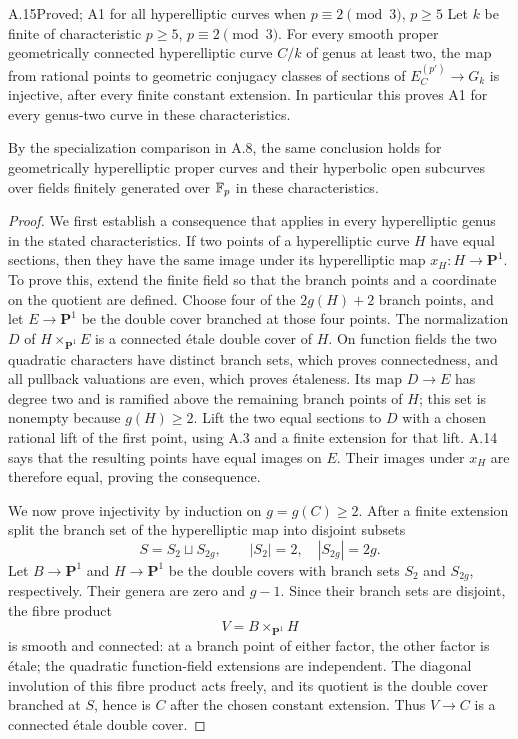 \begin{claim}{A.15}{Proved; A1 for all hyperelliptic curves when $p\equiv2\pmod3$, $p\ge5$}
Let $k$ be finite of characteristic $p\ge5$,
$p\equiv2\pmod3$. For every smooth proper geometrically
connected hyperelliptic curve $C/k$ of genus at least two,
the map from rational points to geometric conjugacy classes
of sections of $E_C^{(p')}\to G_k$ is injective, after every
finite constant extension. In particular this proves A1
for every genus-two curve in these characteristics.

By the specialization comparison in A.8, the same conclusion
holds for geometrically hyperelliptic proper curves and their
hyperbolic open subcurves over fields finitely generated over
$\mathbb F_p$ in these characteristics.
\end{claim}
\begin{proof}
We first establish a consequence that applies in every
hyperelliptic genus in the stated characteristics. If two
points of a hyperelliptic curve $H$ have equal sections, then
they have the same image under its hyperelliptic map
$x_H:H\to\mathbf P^1$.
To prove this, extend the finite field so that the branch
points and a coordinate on the quotient are defined. Choose
four of the $2g(H)+2$ branch points, and let $E\to\mathbf
P^1$ be the double cover branched at those four points.
The normalization $D$ of $H\times_{\mathbf P^1}E$ is a
connected \'etale double cover of $H$. On function fields
the two quadratic characters have distinct branch sets,
which proves connectedness, and all pullback valuations
are even, which proves \'etaleness. Its map $D\to E$ has
degree two and is ramified above the remaining branch
points of $H$; this set is nonempty because $g(H)\ge2$.
Lift the two equal sections to $D$ with a chosen rational
lift of the first point, using A.3 and a finite extension
for that lift. A.14 says that the resulting points have
equal images on $E$. Their images under $x_H$ are therefore
equal, proving the consequence.

We now prove injectivity by induction on $g=g(C)\ge2$.
After a finite extension split the branch set of the
hyperelliptic map into disjoint subsets
\[
 S=S_2\sqcup S_{2g},\qquad |S_2|=2,
 \quad |S_{2g}|=2g.
\]
Let $B\to\mathbf P^1$ and $H\to\mathbf P^1$ be the double
covers with branch sets $S_2$ and $S_{2g}$, respectively.
Their genera are zero and $g-1$. Since their branch sets
are disjoint, the fibre product
\[
 V=B\times_{\mathbf P^1}H
\]
is smooth and connected: at a branch point of either
factor, the other factor is \'etale; the quadratic
function-field extensions are independent. The diagonal
involution of this fibre product acts freely, and its
quotient is the double cover branched at $S$, hence is
$C$ after the chosen constant extension. Thus $V\to C$
is a connected \'etale double cover.


\end{proof}
